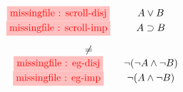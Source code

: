 $$
\begin{array}{c}
  \begin{array}{cc}
    \stkfig{1}{scroll-disj} & A \lor B \\
    \stkfig{1}{scroll-imp} & A \limp B \\[1em]
    \multicolumn{2}{c}{\not=} \\
    \stkfig{1}{eg-disj} & \neg (\neg A \land \neg B) \\
    \stkfig{1}{eg-imp} & \neg (A \land \neg B)
  \end{array}
\end{array}
$$